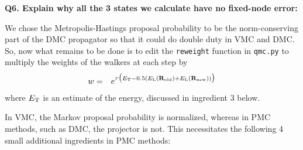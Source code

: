 \documentclass[11pt,aps,prb,amsmath,amssymb,superscriptaddress,notitlepage]{revtex4-1}
\def\beq{\begin{eqnarray}}
\def\eeq{\end{eqnarray}}
\def\Rvec{{\bf R}}
\def\EL{E_{\rm L}}
\begin{document}
{\color{blue}
\textbf{Q6. Explain why all the 3 states we calculate have no fixed-node error:}\\

}

We chose the Metropolis-Hastings proposal probability to be the norm-conserving part of the DMC propagator
so that it could do double duty in VMC and DMC.  So, now what remains to be done is to edit the
\Verb"reweight" function in \Verb"qmc.py" to multiply the
weights of the walkers at each step by
\beq
w &=& e^{\tau\big(\ET-0.5(\EL(\Rvec_{\rm old}) + \EL(\Rvec_{\rm new}))\big)}
\label{rewt}
\eeq
where $E_{\rm T}$ is an estimate of the energy, discussed in ingredient 3 below.

In VMC, the Markov proposal probability is normalized, whereas in PMC methods, such as DMC, the projector is not.
This necessitates the following 4 small additional ingredients in PMC methods:
\end{document}
